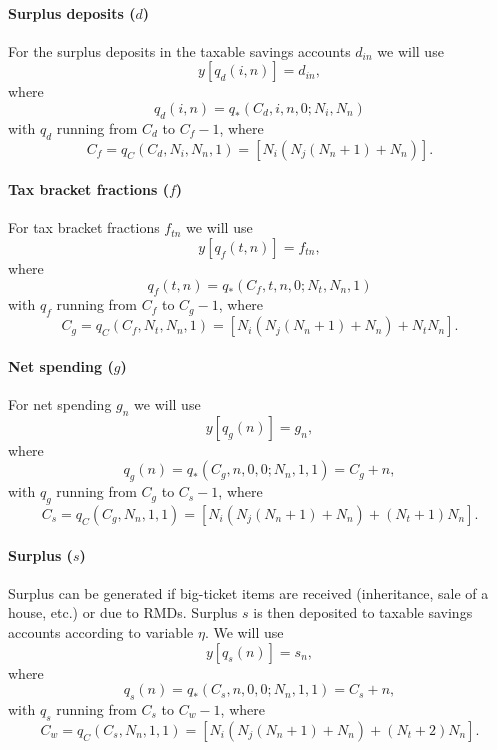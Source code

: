 \documentclass{report}[fleqn,12pt]
\begin{document}
\paragraph*{Surplus deposits (\boldmath$d$)}
For the surplus deposits in the taxable savings accounts $d_{in}$ we will use
\begin{equation}
	y[q_d(i, n)] = d_{in},
\end{equation}
where
\begin{equation}
	q_d(i, n) = q_*(C_d, i, n, 0; N_i, N_n)
\end{equation}
with $q_d$ running from $C_d$ to $C_f - 1$, where
\[
	C_f = q_C(C_d, N_i, N_n, 1) = [N_i(N_j(N_n+1) + N_n)].
\]

\paragraph*{Tax bracket fractions (\boldmath$f$)}
For tax bracket fractions $f_{t n}$ we will use
\begin{equation}
	y[q_f(t, n)] = f_{t n},
\end{equation}
where
\begin{equation}
	q_f(t, n) = q_*(C_f, t, n, 0; N_t, N_n, 1)
\end{equation}
with $q_f$ running from $C_f$ to $C_g - 1$, where
\[
	C_g = q_C(C_f, N_t, N_n, 1) = [N_i(N_j(N_n+1) + N_n) + N_tN_n].
\]

\paragraph*{Net spending (\boldmath$g$)}
For net spending $g_{n}$ we will use
\begin{equation}
	y[q_g(n)] = g_{n},
\end{equation}
where
\begin{equation}
	q_g(n) = q_*(C_g, n, 0, 0; N_n, 1, 1) = C_g + n,
\end{equation}
with $q_g$ running from $C_g$ to $C_s - 1$, where
\[
	C_s = q_C(C_g, N_n, 1, 1) = [N_i(N_j(N_n+1) + N_n) + (N_t + 1) N_n].
\]

\paragraph*{Surplus (\boldmath$s$)}
Surplus can be generated if big-ticket items are received (inheritance, sale of a house, etc.)
or due to RMDs. Surplus $s$ is then deposited to taxable savings accounts according
to variable $\eta$. We will use
\begin{equation}
	y[q_s(n)] = s_{n},
\end{equation}
where
\begin{equation}
	q_s(n) = q_*(C_s, n, 0, 0; N_n, 1, 1) = C_s + n,
\end{equation}
with $q_s$ running from $C_s$ to $C_w - 1$, where
\[
	C_w = q_C(C_s, N_n, 1, 1) = [N_i(N_j(N_n+1) + N_n) + (N_t + 2) N_n].
\]
\end{document}

